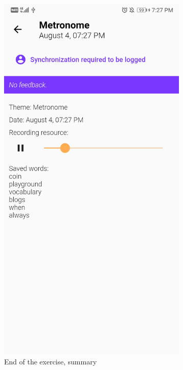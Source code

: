 \begin{appendices}
\begin{landscape}
\begin{figure}[h]
\begin{subfigure}{.25\textwidth}
    \includegraphics[width=.75\linewidth]{content/imgs/screen6.jpg}
    \caption{End of the exercise, summary}
  \end{subfigure}%
  \begin{subfigure}{.25\textwidth}
    \centering

\end{subfigure}
\end{figure}
\end{landscape}
\end{appendices}
